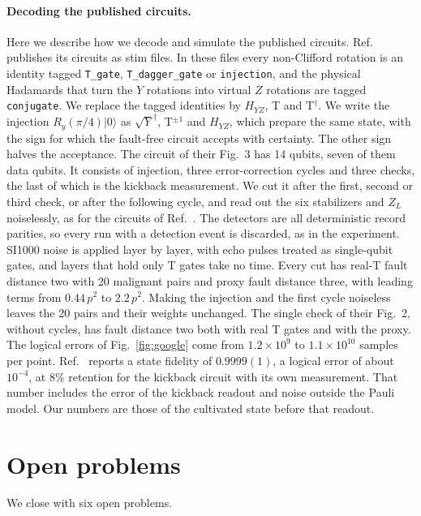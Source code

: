 \documentclass[aps,prl,reprint,twocolumn,amsmath,amssymb,floatfix,nofootinbib,superscriptaddress]{revtex4-2}
\theoremstyle{definition}
\theoremstyle{remark}
\begin{document}
\paragraph*{Decoding the published circuits.}
Here we describe how we decode and simulate the published circuits. Ref.~\cite{googlecultivation} publishes its circuits as stim files. In these files every non-Clifford rotation is an identity tagged \texttt{T\_gate}, \texttt{T\_dagger\_gate} or \texttt{injection}, and the physical Hadamards that turn the $Y$ rotations into virtual $Z$ rotations are tagged \texttt{conjugate}. We replace the tagged identities by $H_{YZ}$, T and T$^\dagger$. We write the injection $R_y(\pi/4)|0\rangle$ as $\sqrt{Y}^\dagger$, T$^{\pm1}$ and $H_{YZ}$, which prepare the same state, with the sign for which the fault-free circuit accepts with certainty. The other sign halves the acceptance. The circuit of their Fig.~3 has 14 qubits, seven of them data qubits. It consists of injection, three error-correction cycles and three checks, the last of which is the kickback measurement. We cut it after the first, second or third check, or after the following cycle, and read out the six stabilizers and $Z_L$ noiselessly, as for the circuits of Ref.~\cite{cultivation}. The detectors are all deterministic record parities, so every run with a detection event is discarded, as in the experiment. SI1000 noise is applied layer by layer, with echo pulses treated as single-qubit gates, and layers that hold only T gates take no time. Every cut has real-T fault distance two with 20 malignant pairs and proxy fault distance three, with leading terms from $0.44\,p^2$ to $2.2\,p^2$. Making the injection and the first cycle noiseless leaves the 20 pairs and their weights unchanged. The single check of their Fig.~2, without cycles, has fault distance two both with real T gates and with the proxy. The logical errors of Fig.~\ref{fig:google} come from $1.2\times10^9$ to $1.1\times10^{10}$ samples per point. Ref.~\cite{googlecultivation} reports a state fidelity of $0.9999(1)$, a logical error of about $10^{-4}$, at 8\% retention for the kickback circuit with its own measurement. That number includes the error of the kickback readout and noise outside the Pauli model. Our numbers are those of the cultivated state before that readout.

\section{Open problems}\label{sm:open}
We close with six open problems.
\end{document}

